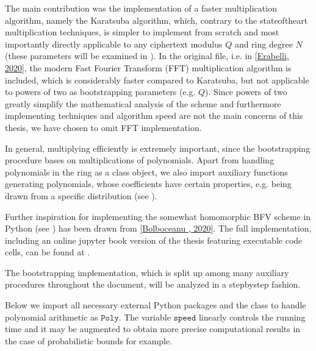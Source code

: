 \documentclass[letterpaper,10pt,english]{jupyterBook}
\begin{document}
\sphinxAtStartPar
The main contribution was the implementation of a faster multiplication algorithm, namely the Karatsuba algorithm, which, contrary to the state\sphinxhyphen{}of\sphinxhyphen{}the\sphinxhyphen{}art multiplication techniques, is simpler to implement from scratch and most importantly directly applicable to any ciphertext modulus \(Q\) and ring degree \(N\) (these parameters will be examined in {\hyperref[\detokenize{Thesis:the-modular-variant-of-the-ring-r}]{}}).
In the original file, i.e. in {[}\hyperlink{cite.Thesis:id75}{Erabelli, 2020}{]}, the modern Fast Fourier Transform (FFT) multiplication algorithm is included, which is considerably faster compared to Karatsuba, but not applicable to powers of two as bootstrapping parameters (e.g. \(Q\)).
Since powers of two greatly simplify the mathematical analysis of the scheme and furthermore implementing techniques and algorithm speed are not the main concerns of this thesis, we have chosen to omit FFT implementation.

\sphinxAtStartPar
In general, multiplying efficiently is extremely important, since the bootstrapping procedure bases on multiplications of polynomials.
Apart from handling polynomials in the ring as a class object, we also import auxiliary functions generating polynomials, whose coefficients have certain properties, e.g. being drawn from a specific distribution (see {\hyperref[\detokenize{Thesis:background-on-probability-theory}]{}}).

\sphinxAtStartPar
Further inspiration for implementing the somewhat homomorphic BFV scheme in Python (see {\hyperref[\detokenize{Thesis:the-bfv-scheme}]{}}) has been drawn from {[}\hyperlink{cite.Thesis:id76}{Bolboceanu , 2020}{]}.
The full implementation, including an online jupyter book version of the thesis featuring executable code cells, can be found at .

\sphinxAtStartPar
The bootstrapping implementation, which is split up among many auxiliary procedures throughout the document, will be analyzed in a step\sphinxhyphen{}by\sphinxhyphen{}step fashion.

\sphinxAtStartPar
Below we import all necessary external Python packages and the class to handle polynomial arithmetic as \(\texttt{Poly}\).
The variable \(\texttt{speed}\) linearly controls the running time and it may be augmented to obtain more precise computational results in the case of probabilistic bounds for example.
\end{document}
